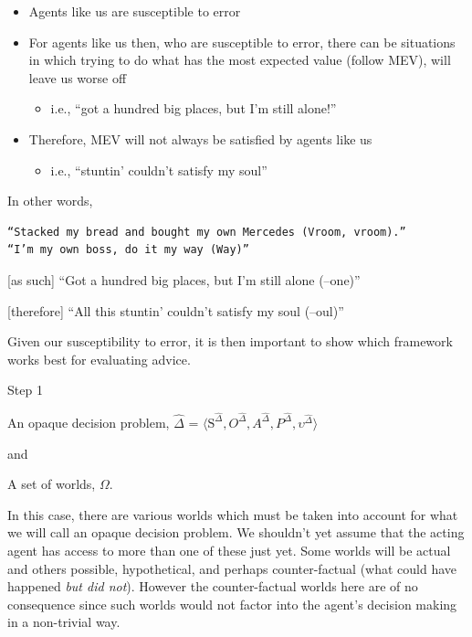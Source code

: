 \documentclass[
  letterpaper,
  DIV=11,
  numbers=noendperiod]{scrartcl}
\providecommand{\tightlist}{%
  \setlength{\itemsep}{0pt}\setlength{\parskip}{0pt}}
\begin{document}
\begin{itemize}
\tightlist
\item
  Agents like us are susceptible to error
\item
  For agents like us then, who are susceptible to error, there can be
  situations in which trying to do what has the most expected value
  (follow MEV), will leave us worse off

  \begin{itemize}
  \tightlist
  \item
    i.e., ``got a hundred big places, but I'm still alone!''
  \end{itemize}
\item
  Therefore, MEV will not always be satisfied by agents like us

  \begin{itemize}
  \tightlist
  \item
    i.e., ``stuntin' couldn't satisfy my soul''
  \end{itemize}
\end{itemize}

In other words,

\begin{verbatim}
“Stacked my bread and bought my own Mercedes (Vroom, vroom).”
“I’m my own boss, do it my way (Way)”
\end{verbatim}

{[}as such{]} ``Got a hundred big places, but I'm still alone (--one)''

{[}therefore{]} ``All this stuntin' couldn't satisfy my soul (--oul)''

Given our susceptibility to error, it is then important to show which
framework works best for evaluating advice.

Step 1

An opaque decision problem, \(\hat{\Delta}\) =
\(\langle \text{S}^{\hat{\Delta}}, O^{\hat{\Delta}}, A^{\hat{\Delta}}, P^{\hat{\Delta}}, \upsilon^{\hat{\Delta}}\rangle\)

and

A set of worlds, \(\Omega\).

In this case, there are various worlds which must be taken into account
for what we will call an opaque decision problem. We shouldn't yet
assume that the acting agent has access to more than one of these just
yet. Some worlds will be actual and others possible, hypothetical, and
perhaps counter-factual (what could have happened \emph{but did not}).
However the counter-factual worlds here are of no consequence since such
worlds would not factor into the agent's decision making in a
non-trivial way.
\end{document}
